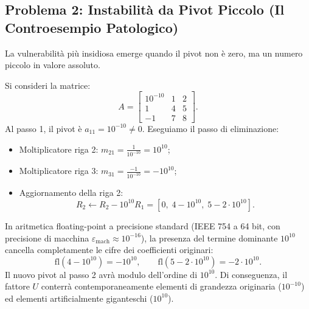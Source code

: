\subsection{Problema 2: Instabilit\`a da Pivot Piccolo (Il Controesempio Patologico)}
La vulnerabilit\`a pi\`u insidiosa emerge quando il pivot non \`e zero, ma un numero piccolo in valore assoluto.

\begin{example}
\label{ex:bad-example-pivot}
Si consideri la matrice:
\begin{equation}
    A = \begin{bmatrix}
        10^{-10} & 1 & 2 \\
        1 & 4 & 5 \\
        -1 & 7 & 8
    \end{bmatrix}.
\end{equation}
Al passo 1, il pivot \`e $a_{11} = 10^{-10} \neq 0$. Eseguiamo il passo di eliminazione:
\begin{itemize}
    \item Moltiplicatore riga 2: $m_{21} = \frac{1}{10^{-10}} = 10^{10}$;
    \item Moltiplicatore riga 3: $m_{31} = \frac{-1}{10^{-10}} = -10^{10}$;
    \item Aggiornamento della riga 2:
    \begin{equation}
        R_2 \leftarrow R_2 - 10^{10} R_1 = \left[0, \; 4 - 10^{10}, \; 5 - 2 \cdot 10^{10}\right].
    \end{equation}
\end{itemize}
In aritmetica floating-point a precisione standard (IEEE 754 a 64 bit, con precisione di macchina $\varepsilon_{\mathrm{mach}} \approx 10^{-16}$), la presenza del termine dominante $10^{10}$ cancella completamente le cifre dei coefficienti originari:
\begin{equation}
    \mathrm{fl}(4 - 10^{10}) = -10^{10}, \qquad \mathrm{fl}(5 - 2 \cdot 10^{10}) = -2 \cdot 10^{10}.
\end{equation}
Il nuovo pivot al passo 2 avr\`a modulo dell'ordine di $10^{10}$. Di conseguenza, il fattore $U$ conterr\`a contemporaneamente elementi di grandezza originaria ($10^{-10}$) ed elementi artificialmente giganteschi ($10^{10}$).
\end{example}

